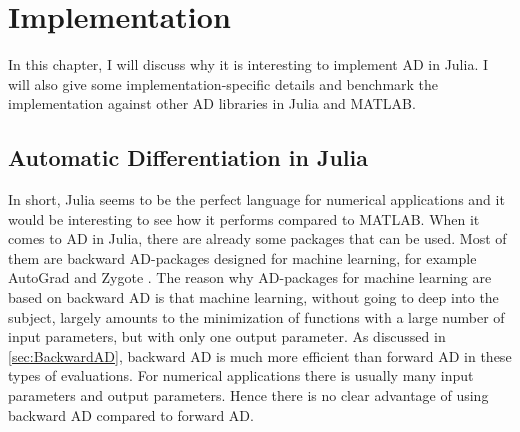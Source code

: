 \chapter{Implementation}
In this chapter, I will discuss why it is interesting to implement AD in Julia. I will also give some implementation-specific details and benchmark the implementation against other AD libraries in Julia and MATLAB.
\label{ch:Implementation}
\section{Automatic Differentiation in Julia}
\label{sec:ADInJulia}
In short, Julia seems to be the perfect language for numerical applications and it would be interesting to see how it performs compared to MATLAB.
When it comes to AD in Julia, there are already some packages that can be used. Most of them are backward AD-packages designed for machine learning, for example AutoGrad \citep{knet2016mlsys} and Zygote \citep{innes2018don}. The reason why AD-packages for machine learning are based on backward AD is that machine learning, without going to deep into the subject, largely amounts to the minimization of functions with a large number of input parameters, but with only one output parameter. As discussed in \autoref{sec:BackwardAD}, backward AD is much more efficient than forward AD in these types of evaluations. For numerical applications there is usually many input parameters and output parameters. Hence there is no clear advantage of using backward AD compared to forward AD. 

